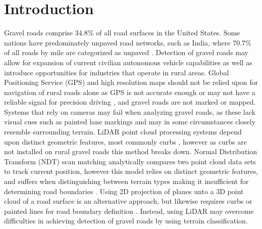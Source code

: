\documentclass[journal,onecolumn]{IEEEtran}
\begin{document}
	
	
	
	\section{Introduction}
	
	
	
	{Gravel roads comprise 34.8\% \cite{road_stats_2} of all road surfaces in the United States. Some nations have predominately unpaved road networks, such as India, where 70.7\% of all roads by mile are categorized as unpaved \cite{malik_lal_2019}. Detection of gravel roads may allow for expansion of current civilian autonomous vehicle capabilities as well as introduce opportunities for industries that operate in rural areas. Global Positioning Service (GPS) and high resolution maps should not be relied upon for navigation of rural roads alone as GPS is not accurate enough or may not have a reliable signal for precision driving \cite{noauthor_gpsgov_nodate}, and gravel roads are not marked or mapped. Systems that rely on cameras may fail when analyzing gravel roads, as these lack visual cues such as painted lane markings \cite{crisman_scarf_1993} and may in some circumstances closely resemble surrounding terrain. LiDAR point cloud processing systems depend upon distinct geometric features, most commonly curbs \cite{yadav_extraction_2017,liu_new_2013,qiu_fast_2016,fernandes_road_2014,seker_experiments_nodate,yang_semi-automated_2013,miyazaki_line-based_2014,hervieu_road_2013,smadja_road_nodate}, however as curbs are not installed on rural gravel roads \cite{skorseth_gravel_nodate} this method breaks down. Normal Distribution Transform (NDT) scan matching analytically compares two point cloud data sets to track current position, however this model relies on distinct geometric features, and suffers when distinguishing between terrain types making it insufficient for determining road boundaries \cite{biber_normal_2003}. Using 2D projection of planes unto a 3D point cloud of a road surface is an alternative approach, but likewise requires curbs or painted lines for road boundary definition \cite{fernandes_road_2014, borkar_robust_2009-1, guo_lane_2015}. Instead, using LiDAR may overcome difficulties in achieving detection of gravel roads by using terrain classification.} 
	
\end{document}
